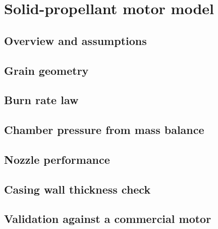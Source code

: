 \section{Solid-propellant motor model}\label{sec:motor}

\subsection{Overview and assumptions}
\subsection{Grain geometry}
\subsection{Burn rate law}
\subsection{Chamber pressure from mass balance}
\subsection{Nozzle performance}
\subsection{Casing wall thickness check}
\subsection{Validation against a commercial motor}
